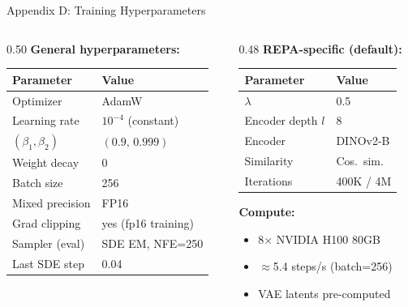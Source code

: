 \documentclass[aspectratio=169, 10pt]{beamer}
\begin{document}
\begin{frame}{Appendix D: Training Hyperparameters}
\small
\begin{columns}[T]
\begin{column}{0.50\textwidth}
\textbf{General hyperparameters:}
\begin{tabular}{ll}
\toprule
\textbf{Parameter} & \textbf{Value} \\
\midrule
Optimizer & AdamW \\
Learning rate & $10^{-4}$ (constant) \\
$(\beta_1, \beta_2)$ & $(0.9,\,0.999)$ \\
Weight decay & 0 \\
Batch size & 256 \\
Mixed precision & FP16 \\
Grad clipping & yes (fp16 training) \\
Sampler (eval) & SDE EM, NFE=250 \\
Last SDE step & 0.04 \\
\bottomrule
\end{tabular}
\end{column}
\begin{column}{0.48\textwidth}
\textbf{REPA-specific (default):}
\begin{tabular}{ll}
\toprule
\textbf{Parameter} & \textbf{Value} \\
\midrule
$\lambda$ & 0.5 \\
Encoder depth $l$ & 8 \\
Encoder & DINOv2-B \\
Similarity & Cos.\ sim. \\
Iterations & 400K / 4M \\
\bottomrule
\end{tabular}

\vspace{0.4em}
\textbf{Compute:}
\begin{itemize}\setlength{\itemsep}{1pt}
  \item 8$\times$ NVIDIA H100 80GB
  \item $\approx$5.4 steps/s (batch=256)
  \item VAE latents pre-computed
\end{itemize}
\end{column}
\end{columns}
\end{frame}
\end{document}
